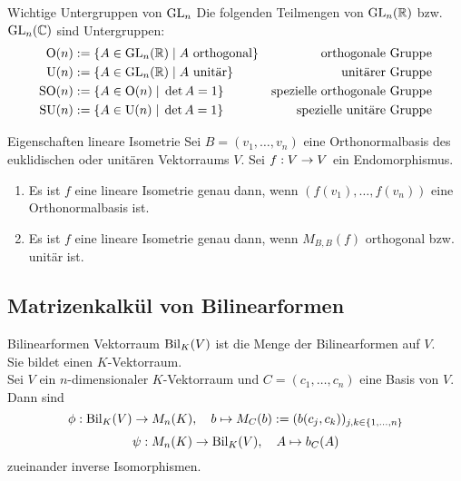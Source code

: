 \documentclass[main.tex]{subfiles}
\begin{document}
\begin{karte}{Wichtige Untergruppen von \(\operatorname{GL}_n\)}
    Die folgenden Teilmengen von \(\operatorname{GL}_n(\mathbb{R})\) bzw. \(\operatorname{GL}_n(\mathbb{C})\) sind Untergruppen:
    \begin{align*}
        \mathrm{O}(n) &:= \{A \in \operatorname{GL}_n(\mathbb{R}) \;\vert\; A \text{ orthogonal}\} &\text{orthogonale Gruppe}\\
        \mathrm{U}(n) &:= \{A \in \operatorname{GL}_n(\mathbb{R}) \;\vert\; A \text{ unitär}\} &\text{unitärer Gruppe}\\
        \mathrm{SO}(n) &:= \{A \in \mathrm{O}(n) \;\vert\; \det A = 1\} &\text{spezielle orthogonale Gruppe}\\
        \mathrm{SU}(n) &:= \{A \in \mathrm{U}(n) \;\vert\; \det A = 1\} &\text{spezielle unitäre Gruppe}
    \end{align*}
\end{karte}

\begin{karte}{Eigenschaften lineare Isometrie}
    Sei \(B = (v_1, \ldots, v_n)\) eine Orthonormalbasis des euklidischen oder unitären 
    Vektorraums \(V\). Sei \(f : V \rightarrow V\) ein Endomorphismus.
    \begin{enumerate}
        \item Es ist \(f\) eine lineare Isometrie genau dann, wenn \((f(v_1), \ldots, f(v_n))\)
        eine Orthonormalbasis ist.
        \item Es ist \(f\) eine lineare Isometrie genau dann, wenn \(M_{B,B}(f)\) orthogonal 
        bzw. unitär ist.
    \end{enumerate}
\end{karte}

\subsection*{Matrizenkalkül von Bilinearformen}

\begin{karte}{Bilinearformen Vektorraum}
    \( \operatorname{Bil}_K(V) \) ist die Menge der 
    Bilinearformen auf \( V \). \\
    Sie bildet einen \( K \)-Vektorraum.\\
    Sei \( V \) ein \(n\)-dimensionaler \(K\)-Vektorraum 
    und \( C=(c_1, \ldots, c_n) \) eine Basis von \(V\).
    Dann sind  
    \[ \phi : \operatorname{Bil}_K(V) \rightarrow M_n(K),\quad b\mapsto M_C(b) := (b(c_j, c_k))_{j,k\in\{1,\ldots,n\}} \]
    \[ \psi : M_n(K) \rightarrow \operatorname{Bil}_K(V),\quad A \mapsto b_C(A) \]
    zueinander inverse Isomorphismen.
\end{karte}
\end{document}
